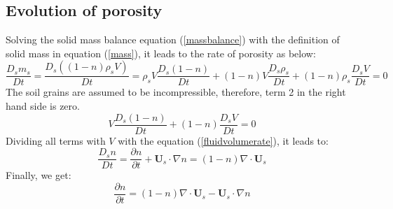 \documentclass[preprint,12pt]{elsarticle}
\begin{document}
\subsection{\textsf{Evolution of porosity}}
%
%
Solving the solid mass balance equation (\ref{massbalance}) with the definition of solid mass in equation (\ref{mass}), it leads to the rate of porosity as below:
%
%
\begin{equation}
   \frac{D_sm_s}{Dt} = \frac{D_s((1-n) \rho_s V)}{Dt} = \rho_s V \frac{D_s(1-n)}{Dt} + (1-n) V \frac{D_s \rho_s}{Dt} + (1-n) \rho_s  \frac{D_s V}{Dt} = 0  
\end{equation}
%
%
The soil grains are assumed to be incompressible, therefore, term 2 in the right hand side is zero. 
%
%
\begin{equation}
  V \frac{D_s(1-n)}{Dt} + (1-n) \frac{D_s V}{Dt} = 0  
\end{equation}
%
%
Dividing all terms with $V$ with the equation (\ref{fluidvolumerate}), it leads to:
%
%
\begin{equation}
  \frac{D_s n}{Dt} = \frac{\partial n}{\partial t} + \pmb{U}_s \cdot \nabla n = 
  (1-n) \nabla \cdot \pmb{U}_s  
\end{equation}
%
%
Finally, we get:
%
%
\begin{equation}
\label{p1}
\frac{\partial n}{\partial t} = (1-n) \nabla \cdot \pmb{U}_s  - \pmb{U}_s \cdot \nabla n
\end{equation}
%
%
\end{document}
